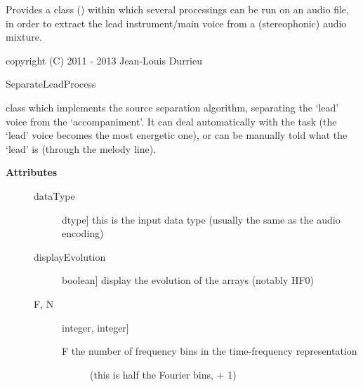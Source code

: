 \documentclass[letterpaper,10pt,english]{sphinxmanual}
\begin{document}
Provides a class () within which several
processings can be run on an audio file, in order to extract the
lead instrument/main voice from a (stereophonic) audio mixture.

copyright (C) 2011 - 2013 Jean-Louis Durrieu

\begin{fulllineitems}
\label{reference/separateleadstereo:pyfasst.SeparateLeadStereo.SeparateLeadStereoTF.SeparateLeadProcess}
SeparateLeadProcess

class which implements the source separation algorithm, separating the
`lead' voice from the `accompaniment'. It can deal automatically with the
task (the `lead' voice becomes the most energetic one), or can be manually
told what the `lead' is (through the melody line).
\begin{description}
\item[{\textbf{Attributes}}] \leavevmode\begin{description}
\item[{dataType}] \leavevmode{[}dtype{]}
this is the input data type (usually the same as the audio encoding)

\item[{displayEvolution}] \leavevmode{[}boolean{]}
display the evolution of the arrays (notably HF0)

\item[{F, N}] \leavevmode{[}integer, integer{]}\begin{description}
\item[{F the number of frequency bins in the time-frequency representation}] \leavevmode
(this is half the Fourier bins, + 1)


\end{description}
\end{description}
\end{description}
\end{fulllineitems}
\end{document}
